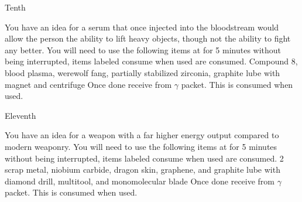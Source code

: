 \documentclass[greennotebook]{guildcamp3} %
\begin{document}
\begin{page}{Tenth}
	
	You have an idea for a serum that once injected into the bloodstream would allow the person the ability to lift heavy objects, though not the ability to fight any better.
	You will need to use the following items at \sSciWorkbench{} for 5 minutes without being interrupted, items labeled consume when used are consumed.
	Compound 8, blood plasma, werewolf fang, partially stabilized zirconia, graphite lube with magnet and centrifuge
	Once done receive \iSteroids{} from $\gamma$ packet. This is consumed when used. 
	
\end{page}

\begin{page}{Eleventh}
	
	You have an idea for a weapon with a far higher energy output compared to modern weaponry.
	You will need to use the following items at \sSciWorkbench{} for 5 minutes without being interrupted, items labeled consume when used are consumed.
	2 scrap metal, niobium carbide, dragon skin, graphene, and graphite lube with diamond drill, multitool, and monomolecular blade
	Once done receive \iUpgradedTechGun{} from $\gamma$ packet. This is consumed when used. 
	
\end{page}




\endnotebook
\end{document}
